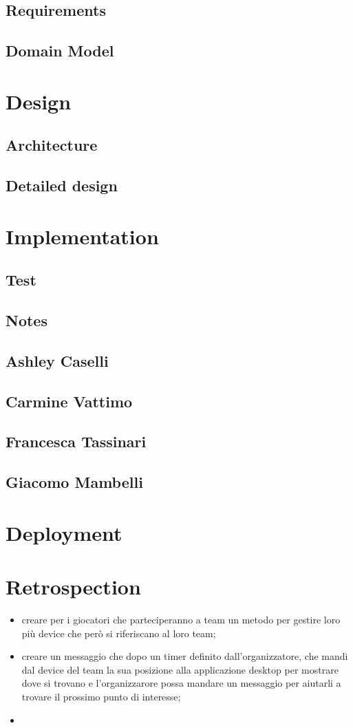\documentclass[10pt, english]{article}
\begin{document}
\subsection{Requirements}
\subsection{Domain Model}

\section{Design}
\subsection{Architecture}
\subsection{Detailed design}
\section{Implementation}
\subsection{Test}
\subsection{Notes}
\subsection{Ashley Caselli}
\subsection{Carmine Vattimo}
\subsection{Francesca Tassinari}
\subsection{Giacomo Mambelli}
\section{Deployment}
\section{Retrospection}
\begin{itemize}
	\item creare per i giocatori che parteciperanno a team un metodo per gestire loro più device che però si riferiscano al loro team;
	\item creare un messaggio che dopo un timer definito dall'organizzatore, che mandi dal device del team la sua posizione alla applicazione desktop per mostrare dove si trovano e l'organizzarore possa mandare un messaggio per aiutarli a trovare il prossimo punto di interesse;
	\item 
\end{itemize}

\vspace{-30pt}
\end{document}
